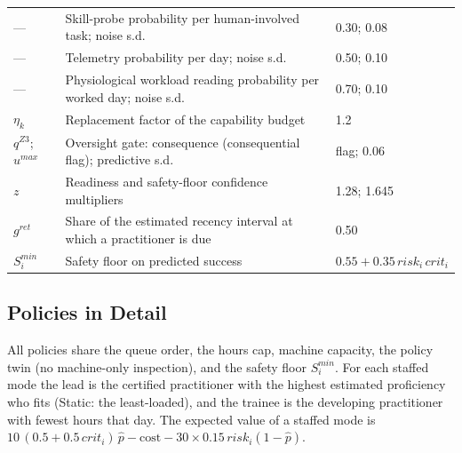 \documentclass[utf8]{frontiers_suppmat}
\begin{document}
\begin{table}[!htbp]
\begin{tabularx}{\textwidth}{@{}lXl@{}}
		--- & Skill-probe probability per human-involved task; noise s.d. & 0.30; 0.08\\
		--- & Telemetry probability per day; noise s.d. & 0.50; 0.10\\
		--- & Physiological workload reading probability per worked day; noise s.d. & 0.70; 0.10\\
		$\eta_k$ & Replacement factor of the capability budget & 1.2\\
		$q^{Z3}$; $u^{max}$ & Oversight gate: consequence (consequential flag); predictive s.d. & flag; 0.06\\
		$z$ & Readiness and safety-floor confidence multipliers & 1.28; 1.645\\
		$g^{ret}$ & Share of the estimated recency interval at which a practitioner is due & 0.50\\
		$S^{min}_i$ & Safety floor on predicted success & $0.55+0.35\,risk_i\,crit_i$\\
		\bottomrule
	\end{tabularx}
\end{table}

\subsection{Policies in Detail}
\label{app:protocol-policies}

All policies share the queue order, the hours cap, machine capacity, the policy twin (no machine-only inspection), and the safety floor $S^{min}_i$. For each staffed mode the lead is the certified practitioner with the highest estimated proficiency who fits (Static: the least-loaded), and the trainee is the developing practitioner with fewest hours that day. The expected value of a staffed mode is $10\,(0.5+0.5\,crit_i)\,\hat p-\text{cost}-30\times0.15\,risk_i(1-\hat p)$.
\end{document}
